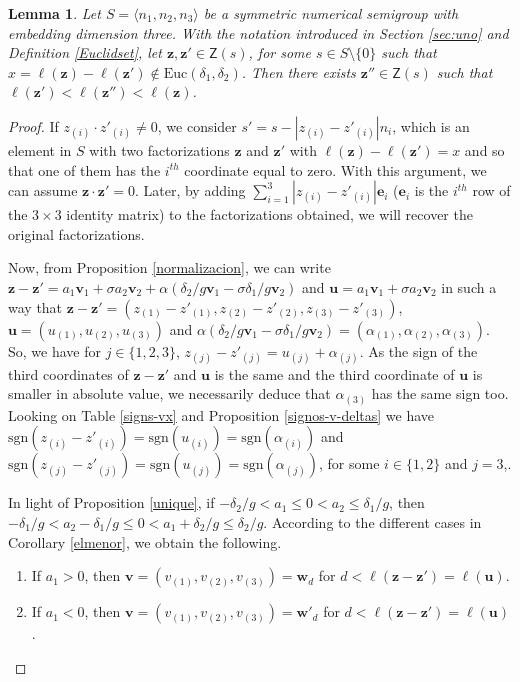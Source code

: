 \documentclass[11pt]{amsart}
\newtheorem{lemma}[theorem]{Lemma}
\theoremstyle{remark}
\begin{document}
\begin{lemma}\label{noesta}
Let $S=\langle n_1,n_2,n_3\rangle$ be a symmetric numerical semigroup with embedding dimension three. With the notation introduced in Section \ref{sec:uno} and Definition \ref{Euclidset}, let $\mathbf z,\mathbf z'\in\mathsf Z(s)$, for some $s\in S\setminus\{0\}$ such that $x=\ell(\mathbf z)-\ell(\mathbf z')\notin \mathrm {Euc}(\delta_1,\delta_2)$. Then there exists $\mathbf z'' \in \mathsf Z(s)$ such that $\ell(\mathbf z')<\ell(\mathbf z'')<\ell(\mathbf z)$.
\end{lemma}
\begin{proof}
If $z_{(i)}\cdot z'_{(i)}\neq 0$, we consider $s'=s-|z_{(i)}-z'_{(i)}|n_i$, which is an element in $S$ with two factorizations $\mathbf z$ and $\mathbf z'$ with $\ell(\mathbf z)-\ell(\mathbf z')=x$ and so that one of them has the $i^{th}$ coordinate equal to zero. With this argument, we can assume  $\mathbf z\cdot \mathbf z'=0$. Later, by adding $\sum_{i=1}^3|z_{(i)}-z'_{(i)}|\mathbf e_i$ ($\mathbf e_i$ is the $i^{th}$ row of the $3\times 3$ identity matrix) to the factorizations obtained, we will recover the original factorizations.

Now, from Proposition \ref{normalizacion}, we can write $\mathbf z-\mathbf z'=a_1\mathbf v_1+\sigma a_2\mathbf v_2+\alpha(\delta_2/g\mathbf v_1-\sigma\delta_1/g\mathbf v_2)$ and  $\mathbf u=a_1\mathbf v_1+\sigma a_2\mathbf v_2$ in such a way that  $\mathbf z-\mathbf z'=(z_{(1)}-z'_{(1)},z_{(2)}-z'_{(2)},z_{(3)}-z'_{(3)})$, $\mathbf u=(u_{(1)},u_{(2)},u_{(3)})$ and $\alpha(\delta_2/g\mathbf v_1-\sigma\delta_1/g\mathbf v_2)=(\alpha_{(1)},\alpha_{(2)},\alpha_{(3)})$. So, we have for $j\in\{1,2,3\}$, $z_{(j)}-z'_{(j)}=u_{(j)}+\alpha_{(j)}$. As the sign of the third coordinates of $\mathbf z-\mathbf z'$ and $\mathbf u$ is the same and the third coordinate of $\mathbf u$ is smaller in absolute value, we necessarily deduce that $\alpha_{(3)}$ has the same sign too. Looking on Table \ref{signs-vx} and Proposition \ref{signos-v-deltas} we have  $\mathrm{sgn}(z_{(i)}-z'_{(i)})=\mathrm{sgn}(u_{(i)})=\mathrm{sgn}(\alpha_{(i)})$ and  $\mathrm{sgn}(z_{(j)}-z'_{(j)})=\mathrm{sgn}(u_{(j)})=\mathrm{sgn}(\alpha_{(j)})$, for some $i\in\{1,2\}$  and $j=3$,.

In light of Proposition \ref{unique}, if $-\delta_2/g<a_1\le 0<a_2\le \delta_1/g$, then $-\delta_1/g<a_2-\delta_1/g\le 0 <a_1+\delta_2/g\le \delta_2/g$. According to the different cases in Corollary \ref{elmenor}, we obtain the following.
\begin{enumerate} 
  \item If $a_1>0$, then $\mathbf v=(v_{(1)},v_{(2)},v_{(3)})=\mathbf w_d$ for $d<\ell(\mathbf z-\mathbf z')=\ell(\mathbf u)$.
  \item If $a_1<0$, then $\mathbf v=(v_{(1)},v_{(2)},v_{(3)})=\mathbf w'_d$ for $d<\ell(\mathbf z-\mathbf z')=\ell(\mathbf u)$.     
\end{enumerate}     


\end{proof}
\end{document}
